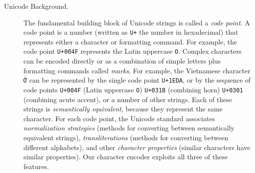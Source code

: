 \documentclass[sigconf,10pt]{acmart}
\newcommand{\str}[1]{\texttt{#1}}
\newcommand{\defn}[1]{\textit{#1}}
\begin{document}
\begin{description}


\item[Unicode Background.]
The fundamental building block of Unicode strings is called a \defn{code point}.
A code point is a number (written as \str{U+} the number in hexadecimal)
that represents either a character or formatting command.
For example, the code point \str{U+004F} represents the Latin uppercase \str{O}.
Complex characters can be encoded directly or as a combination of simple letters plus formatting commands called \defn{marks}.
For example, the Vietnamese character \str{\foreignlanguage{vietnamese}{Ớ}} can be represented by the single code point \str{U+1EDA},
or by the sequence of code points \str{U+004F} (Latin uppercase \str{O}) \str{U+031B} (combining horn) \str{U+0301} (combining acute accent),
or a number of other strings.
Each of these strings is \defn{semantically equivalent},
because they represent the same character.
For each code point, the Unicode standard \citep{Unicode} associates 
\defn{normalization strategies} (methods for converting between semantically equivalent strings), 
\defn{transliterations} (methods for converting between different alphabets), 
and other \defn{character properties} (similar characters have similar properties).
Our character encoder exploits all three of these features.



\end{description}
\end{document}
